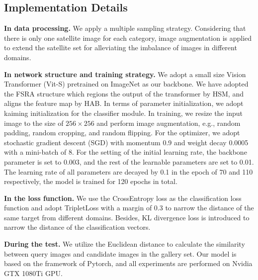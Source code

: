 \documentclass[lettersize,journal]{IEEEtran}
\begin{document}
\subsection{Implementation Details}

\textbf{In data processing.} We apply a multiple sampling strategy. Considering that there is only one satellite image for each category, image augmentation is applied to extend the satellite set for alleviating the imbalance of images in different domains.

\textbf{In network structure and training strategy.} We adopt a small size Vision Transformer (Vit-S) pretrained on ImageNet as our backbone. We have adopted the FSRA structure which regions the output of the transformer by HSM, and aligns the feature map by HAB. In terms of parameter initialization, we adopt kaiming initialization \cite{ref49} for the classifier module. In training, we resize the input image to the size of $256\times{}256$ and perform image augmentation, e.g., random padding, random cropping, and random flipping. For the optimizer, we adopt stochastic gradient descent (SGD) with momentum 0.9 and weight decay 0.0005 with a mini-batch of 8. For the setting of the initial learning rate, the backbone parameter is set to 0.003, and the rest of the learnable parameters are set to 0.01. The learning rate of all parameters are decayed by 0.1 in the epoch of 70 and 110 respectively, the model is trained for 120 epochs in total. 

\textbf{In the loss function.} We use the CrossEntropy loss as the classification loss function and adopt TripletLoss with a margin of 0.3 to narrow the distance of the same target from different domains. Besides, KL divergence loss is introduced to narrow the distance of the classification vectors. 

\textbf{During the test.} We utilize the Euclidean distance to calculate the similarity between query images and candidate images in the gallery set. Our model is based on the framework of Pytorch, and all experiments are performed on Nvidia GTX 1080Ti GPU.
\end{document}

